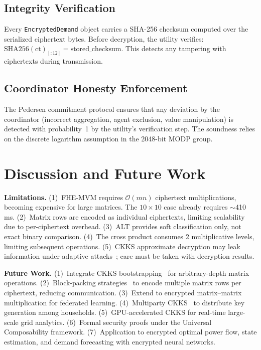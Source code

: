 \subsection{Integrity Verification}

Every \texttt{EncryptedDemand} object carries a SHA-256 checksum computed over the serialized ciphertext bytes. Before decryption, the utility verifies: $\text{SHA256}(\text{ct})_{[:12]} = \text{stored\_checksum}$. This detects any tampering with ciphertexts during transmission.

\subsection{Coordinator Honesty Enforcement}

The Pedersen commitment protocol ensures that any deviation by the coordinator (incorrect aggregation, agent exclusion, value manipulation) is detected with probability~1 by the utility's verification step. The soundness relies on the discrete logarithm assumption in the 2048-bit MODP group.

\section{Discussion and Future Work}
\label{sec:discussion}

\textbf{Limitations.} (1)~FHE-MVM requires $\mathcal{O}(mn)$ ciphertext multiplications, becoming expensive for large matrices. The $10 \times 10$ case already requires $\sim$410\,ms. (2)~Matrix rows are encoded as individual ciphertexts, limiting scalability due to per-ciphertext overhead. (3)~ALT provides soft classification only, not exact binary comparison. (4)~The cross product consumes 2 multiplicative levels, limiting subsequent operations. (5)~CKKS approximate decryption may leak information under adaptive attacks~\cite{Li2021ckks}; care must be taken with decryption results.

\textbf{Future Work.} (1)~Integrate CKKS bootstrapping~\cite{Cheon2018bootstrapping, Bossuat2021} for arbitrary-depth matrix operations. (2)~Block-packing strategies~\cite{Jiang2018} to encode multiple matrix rows per ciphertext, reducing communication. (3)~Extend to encrypted matrix--matrix multiplication for federated learning. (4)~Multiparty CKKS~\cite{Mouchet2020} to distribute key generation among households. (5)~GPU-accelerated CKKS for real-time large-scale grid analytics. (6)~Formal security proofs under the Universal Composability framework. (7)~Application to encrypted optimal power flow, state estimation, and demand forecasting with encrypted neural networks.

